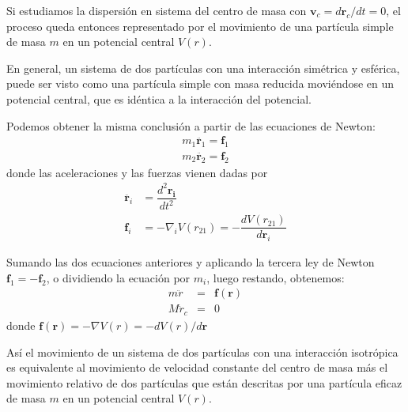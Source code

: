 \begin{frame}
Si estudiamos la dispersión en sistema del centro de masa con $\mathbf{v}_{c} = d\mathbf{r}_{c}/dt = 0$, el proceso queda entonces representado por el movimiento de una partícula simple de masa $m$ en un potencial central $V(r)$.
\end{frame}
\begin{frame}
En general, un sistema de dos partículas con una interacción simétrica y esférica, puede ser visto como una partícula simple con masa reducida moviéndose en un potencial central, que es idéntica a la interacción del potencial.
\end{frame}
\begin{frame}
Podemos obtener la misma conclusión a partir de las ecuaciones de Newton:
\begin{eqnarray}
m_{1} \ddot{\mathbf{r}_{1}} = \mathbf{f}_{1} \\
m_{2} \ddot{\mathbf{r}_{2}} = \mathbf{f}_{2} 
\end{eqnarray}
donde las aceleraciones y las fuerzas vienen dadas por
\begin{align*}
\ddot{\mathbf{r}_{i}} &= \dfrac{d^{2} \mathbf{r_{i}}}{dt^{2}} \\
\mathbf{f}_{i} &= - \nabla_{i} V(r_{21}) = - \dfrac{d V(r_{21})}{d \mathbf{r}_{i}}
\end{align*}
\end{frame}
\begin{frame}
Sumando las dos ecuaciones anteriores y aplicando la tercera ley de Newton $\mathbf{f}_{1} = - \mathbf{f}_{2}$, o dividiendo la ecuación por $m_{i}$, luego restando, obtenemos:
\begin{eqnarray}
m \ddot{r} &=& \mathbf{f(r)} \\
M \ddot{r}_{c} &=& 0
\end{eqnarray}
donde $\mathbf{f(r)}= - \nabla V(r) = - dV(r)/ d\mathbf{r}$
\end{frame}
\begin{frame}
Así el movimiento de un sistema de dos partículas con una interacción isotrópica es equivalente al movimiento de velocidad constante del centro de masa más el movimiento relativo de dos partículas que están descritas por una partícula eficaz de masa $m$ en un potencial central $V(r)$.
\end{frame}

